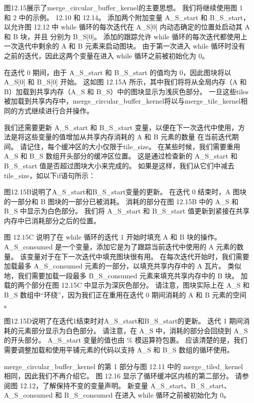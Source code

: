 图12.15展示了merge\_circular\_buffer\_kernel的主要思想。 我们将继续使用图 1 和 2 中的示例。 12.10 和 12.14。 添加两个附加变量 A\_S\_start 和 B\_S\_start，以允许图 12.12 中 while 循环的每次迭代在 A\_S[0] 内动态确定的位置处启动其 A 和 B 块，并且 分别为 B\_S[0]。 添加的跟踪允许 while 循环的每次迭代都使用上一次迭代中剩余的 A 和 B 元素来启动图块。 由于第一次进入 while 循环时没有之前的迭代，因此这两个变量在进入 while 循环之前被初始化为 0。

在迭代 0 期间，由于 A\_S\_start 和 B\_S\_start 的值均为 0，因此图块将以 A\_S[0] 和 B\_S[0] 开始。 这如图 12.15A 所示，其中我们将将从全局内存（A 和 B）加载到共享内存（A\_S 和 B\_S）中的图块显示为浅灰色部分。 一旦这些tiles被加载到共享内存中，merge\_circular\_buffer\_kernel将以与merge\_tile\_kernel相同的方式继续进行合并操作。

我们还需要更新 A\_S\_start 和 B\_S\_start 变量，以便在下一次迭代中使用，方法是将这些变量的值增加从共享内存消耗的 $\mathrm{A}$ 和 B 元素的数量 在当前迭代期间。 请记住，每个缓冲区的大小仅限于tile\_size。 在某些时候，我们需要重用 A\_S 和 B\_S 数组开头部分的缓冲区位置。 这是通过检查新的 A\_S\_start 和 B\_S\_start 值是否超过图块大小来完成的。 如果是这样，我们从它们中减去tile\_size，如以下if语句所示：

图12.15B说明了A\_S\_start和B\_S\_start变量的更新。 在迭代 0 结束时，$\mathrm{A}$ 图块的一部分和 $\mathrm{B}$ 图块的一部分已被消耗。 消耗的部分在图 12.15B 中的 A\_S 和 B\_S 中显示为白色部分。 我们将 A\_S\_start 和 B\_S\_start 值更新到紧接在共享内存中已消耗部分之后的位置。

图 $12.15 \mathrm{C}$ 说明了在 while 循环的迭代 1 开始时填充 $\mathrm{A}$ 和 $\mathrm{B}$ 块的操作。 A\_S\_consumed 是一个变量，添加它是为了跟踪当前迭代中使用的 $\mathrm{A}$ 元素的数量。 该变量对于在下一次迭代中填充图块很有用。 在每次迭代开始时，我们需要加载最多 A\_S\_consumed 元素的一部分，以填充共享内存中的 A 瓦片。 类似地，我们需要加载一段最多 B\_S\_consumed 元素来填充共享内存中的 B 块。 加载的两个部分在图 12.15C 中显示为深灰色部分。 请注意，图块实际上在 A\_S 和 B\_S 数组中“环绕”，因为我们正在重用在迭代 0 期间消耗的 $\mathrm{A}$ 和 $\mathrm{B}$ 元素的空间 。

图12.15D说明了在迭代1结束时对A\_S\_start和B\_S\_start的更新。 迭代 1 期间消耗的元素部分显示为白色部分。 请注意，在 A\_S 中，消耗的部分会回绕到 A\_S 的开头部分。 A\_S\_start 变量的值也由 \% 模运算符包裹。 应该清楚的是，我们需要调整加载和使用平铺元素的代码以支持 A\_S 和 B\_S 数组的循环使用。

merge\_circular\_buffer\_kernel 的第 1 部分与图 12.11 中的 merge\_tiled\_kernel 相同，因此我们不再介绍它。 图 12.16 显示了循环缓冲区内核的第二部分。 请参阅图 12.12，了解保持不变的变量声明。 新变量 A\_S\_start、B\_S\_start、A\_S\_consumed 和 B\_S\_consumed 在进入 while 循环之前被初始化为 0。

